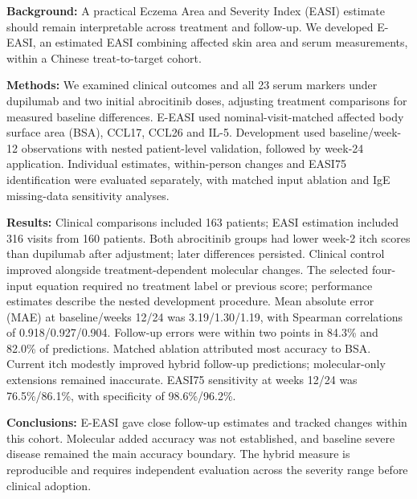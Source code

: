 \textbf{Background:} A practical Eczema Area and Severity Index (EASI) estimate should remain interpretable across treatment and follow-up. We developed E-EASI, an estimated EASI combining affected skin area and serum measurements, within a Chinese treat-to-target cohort.

\textbf{Methods:} We examined clinical outcomes and all 23 serum markers under dupilumab and two initial abrocitinib doses, adjusting treatment comparisons for measured baseline differences. E-EASI used nominal-visit-matched affected body surface area (BSA), CCL17, CCL26 and IL-5. Development used baseline/week-12 observations with nested patient-level validation, followed by week-24 application. Individual estimates, within-person changes and EASI75 identification were evaluated separately, with matched input ablation and IgE missing-data sensitivity analyses.

\textbf{Results:} Clinical comparisons included 163 patients; EASI estimation included 316 visits from 160 patients. Both abrocitinib groups had lower week-2 itch scores than dupilumab after adjustment; later differences persisted. Clinical control improved alongside treatment-dependent molecular changes. The selected four-input equation required no treatment label or previous score; performance estimates describe the nested development procedure. Mean absolute error (MAE) at baseline/weeks 12/24 was 3.19/1.30/1.19, with Spearman correlations of 0.918/0.927/0.904. Follow-up errors were within two points in 84.3\% and 82.0\% of predictions. Matched ablation attributed most accuracy to BSA. Current itch modestly improved hybrid follow-up predictions; molecular-only extensions remained inaccurate. EASI75 sensitivity at weeks 12/24 was 76.5\%/86.1\%, with specificity of 98.6\%/96.2\%.

\textbf{Conclusions:} E-EASI gave close follow-up estimates and tracked changes within this cohort. Molecular added accuracy was not established, and baseline severe disease remained the main accuracy boundary. The hybrid measure is reproducible and requires independent evaluation across the severity range before clinical adoption.
